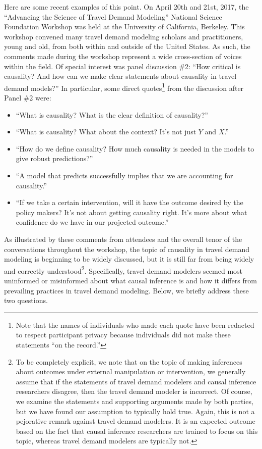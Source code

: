 Here are some recent examples of this point. On April 20th and 21st, 2017, the ``Advancing the Science of Travel Demand Modeling'' National Science Foundation Workshop was held at the University of California, Berkeley. This workshop convened many travel demand modeling scholars and practitioners, young and old, from both within and outside of the United States. As such, the comments made during the workshop represent a wide cross-section of voices within the field. Of special interest was panel discussion \#2: ``How critical is causality? And how can we make clear statements about causality in travel demand models?'' In particular, some direct quotes\footnote{Note that the names of individuals who made each quote have been redacted to respect participant privacy because individuals did not make these statements ``on the record.''} from the discussion after Panel \#2 were:
\begin{itemize}
\item ``What is causality? What is the clear definition of causality?''

\item ``What is causality? What about the context? It's not just $Y$ and $X$.''

\item ``How do we define causality? How much causality is needed in the models to give robust predictions?''

\item ``A model that predicts successfully implies that we are accounting for causality.''

\item ``If we take a certain intervention, will it have the outcome desired by the policy makers? It's not about getting causality right. It's more about what confidence do we have in our projected outcome.''

\end{itemize}
As illustrated by these comments from attendees and the overall tenor of the conversations throughout the workshop, the topic of causality in travel demand modeling is beginning to be widely discussed, but it is still far from being widely and correctly understood\footnote{To be completely explicit, we note that on the topic of making inferences about outcomes under external manipulation or intervention, we generally assume that if the statements of travel demand modelers and causal inference researchers disagree, then the travel demand modeler is incorrect. Of course, we examine the statements and supporting arguments made by both parties, but we have found our assumption to typically hold true. Again, this is not a pejorative remark against travel demand modelers. It is an expected outcome based on the fact that causal inference researchers are trained to focus on this topic, whereas travel demand modelers are typically not.}. Specifically, travel demand modelers seemed most uninformed or misinformed about what causal inference is and how it differs from prevailing practices in travel demand modeling. Below, we briefly address these two questions.

